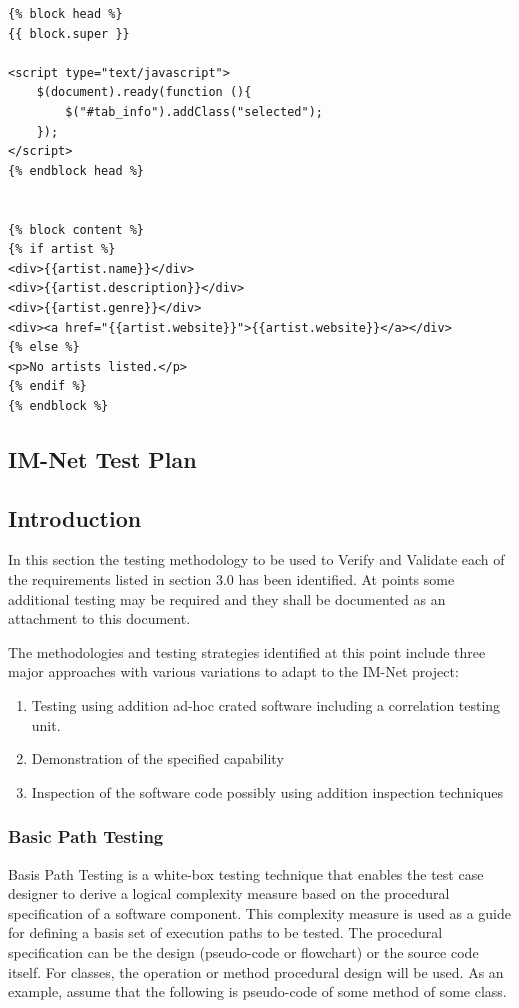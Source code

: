 \documentclass[letterpaper,12pt]{article}
\newcommand{\Section}[1]{\section{#1} \setcounter{figure}{0}}
\begin{document}
{\begin{verbatim}
{% block head %}
{{ block.super }}

<script type="text/javascript">
    $(document).ready(function (){
        $("#tab_info").addClass("selected");
    });
</script>
{% endblock head %}


{% block content %}
{% if artist %}
<div>{{artist.name}}</div>
<div>{{artist.description}}</div>
<div>{{artist.genre}}</div>
<div><a href="{{artist.website}}">{{artist.website}}</a></div>
{% else %}
<p>No artists listed.</p>
{% endif %}
{% endblock %}
\end{verbatim}

\eject 

\textcolor{section}{\Section{IM-Net Test Plan}}

\textcolor{subsection}{\subsection{Introduction}}

In this section the testing methodology to be used to Verify and Validate each of the requirements listed in section 3.0 has been identified. At points some additional testing may be required and they shall be documented as an attachment to this document. 

The methodologies and testing strategies identified at this point include three major approaches with various variations to adapt to the IM-Net project:

\begin{enumerate}
\item  Testing using addition ad-hoc crated software including a correlation testing unit.

\item  Demonstration of the specified capability

\item  Inspection of the software code possibly using addition inspection techniques
\end{enumerate}

\textcolor{subsubsection}{\subsubsection{Basic Path Testing}}
Basis Path Testing is a white-box testing technique that enables the test case designer to derive a logical complexity measure based on the procedural specification of a software component. This complexity measure is used as a guide for defining a basis set of execution paths to be tested. The procedural specification can be the design (pseudo-code or flowchart) or the source code itself. For classes, the operation or method procedural design will be used. As an example, assume that the following is pseudo-code of some method of some class.

}
\end{document}
